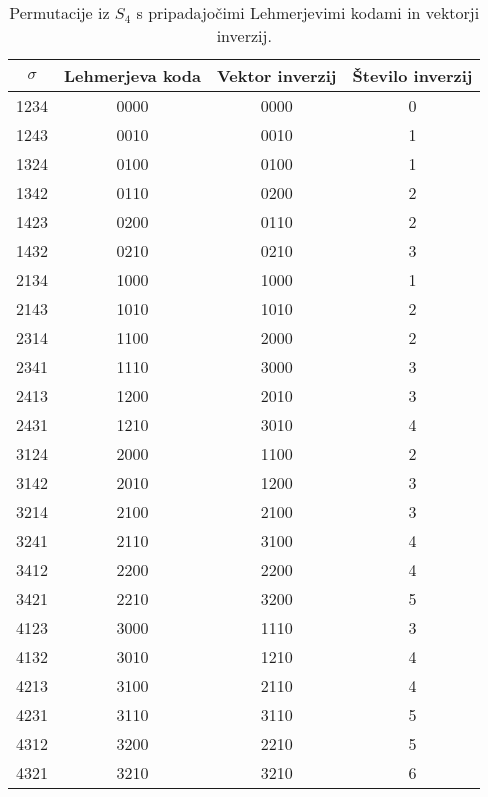 \documentclass[a4paper, 12pt]{book}
\begin{document}
\begin{table}[h]
    \begin{center}
        \begin{tabular}{ |c|c|c|c| } 
        \hline
            $\sigma$ & Lehmerjeva koda & Vektor inverzij & Število inverzij \\ 
        \hline
            1234 & 0000 & 0000 & 0 \\ 
        \hline
            1243 & 0010 & 0010 & 1 \\ 
        \hline
            1324 & 0100 & 0100 & 1 \\ 
        \hline
            1342 & 0110 & 0200 & 2 \\ 
        \hline
            1423 & 0200 & 0110 & 2 \\ 
        \hline
            1432 & 0210 & 0210 & 3 \\ 
        \hline
            2134 & 1000 & 1000 & 1 \\ 
        \hline
            2143 & 1010 & 1010 & 2 \\ 
        \hline
            2314 & 1100 & 2000 & 2 \\ 
        \hline
            2341 & 1110 & 3000 & 3 \\ 
        \hline
            2413 & 1200 & 2010 & 3 \\ 
        \hline
            2431 & 1210 & 3010 & 4 \\ 
        \hline
            3124 & 2000 & 1100 & 2 \\ 
        \hline
            3142 & 2010 & 1200 & 3 \\ 
        \hline
            3214 & 2100 & 2100 & 3 \\ 
        \hline
            3241 & 2110 & 3100 & 4 \\ 
        \hline
            3412 & 2200 & 2200 & 4 \\ 
        \hline
            3421 & 2210 & 3200 & 5 \\ 
        \hline
            4123 & 3000 & 1110 & 3 \\ 
        \hline
            4132 & 3010 & 1210 & 4 \\ 
        \hline
            4213 & 3100 & 2110 & 4 \\ 
        \hline
            4231 & 3110 & 3110 & 5 \\
        \hline
            4312 & 3200 & 2210 & 5 \\ 
        \hline
            4321 & 3210 & 3210 & 6 \\ 
        \hline
        \end{tabular}
    \end{center}
    \caption{ Permutacije iz $S_4$ s pripadajočimi Lehmerjevimi kodami in vektorji inverzij. }
    \label{tbl:permutacije4vektorji}
\end{table}
\end{document}
